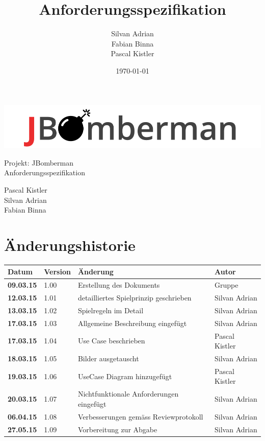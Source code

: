 \documentclass[11pt]{scrartcl}
\title{Anforderungsspezifikation}
\author{Silvan Adrian \\ Fabian Binna \\ Pascal Kistler}
\date{\today{}}
\begin{document}
\def\arraystretch{1.5}
\begin{titlepage}
\begin{center}
\vspace{10em}
\includegraphics[scale=2]{jbomberman}
\vspace{10em}
\end{center}
\begin{center}
\huge {Projekt: JBomberman} \\
\huge {Anforderungsspezifikation}
\end{center}
\begin{center}
\vspace{10em}
\LARGE {Pascal Kistler} \\
\LARGE {Silvan Adrian} \\
\LARGE {Fabian Binna}
\end{center}

\end{titlepage}

\newpage
\section{Änderungshistorie}
\label{sec:Änderungen}

\begin{tabularx}{\linewidth}{l l l l}
\textbf{Datum} & \textbf{Version} & \textbf{Änderung}  & \textbf{Autor} \\
\hline
\textbf{09.03.15} & 1.00 & Erstellung des Dokuments & Gruppe \\
\textbf{12.03.15} & 1.01 & detailliertes Spielprinzip geschrieben & Silvan Adrian \\
\textbf{13.03.15} & 1.02 & Spielregeln im Detail & Silvan Adrian \\
\textbf{17.03.15} & 1.03 & Allgemeine Beschreibung eingefügt & Silvan Adrian \\
\textbf{17.03.15} & 1.04 & Use Case beschrieben  & Pascal Kistler \\
\textbf{18.03.15} & 1.05 & Bilder ausgetauscht & Silvan Adrian \\
\textbf{19.03.15} & 1.06 & UseCase Diagram hinzugefügt & Pascal Kistler \\
\textbf{20.03.15} & 1.07 & Nichtfunktionale Anforderungen eingefügt & Silvan Adrian \\
\textbf{06.04.15} & 1.08 & Verbesserungen gemäss Reviewprotokoll & Silvan Adrian \\
\textbf{27.05.15} & 1.09 & Vorbereitung zur Abgabe & Silvan Adrian\\
\end{tabularx}
\end{document}
